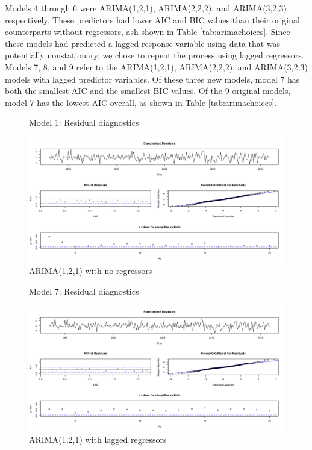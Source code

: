 \documentclass[twoside,twocolumn]{article}
\begin{document}
Models 4 through 6 were ARIMA(1,2,1), ARIMA(2,2,2), and ARIMA(3,2,3) respectively.  These predictors had lower AIC and BIC values than their original counterparts without regressors, ash shown in Table \ref{tab:arimachoices}. Since these models had predicted a lagged response variable using data that was potentially nonstationary, we chose to repeat the process using lagged regressors.  Models 7, 8, and 9 refer to the ARIMA(1,2,1), ARIMA(2,2,2), and ARIMA(3,2,3) models with lagged predictor variables.  Of these three new models, model 7 has both the smallest AIC and the smallest BIC values. Of the 9 original models, model 7 has the lowest AIC overall, as shown in Table \ref{tab:arimachoices}.


		    \begin{figure}[htb]
    	\centering
    	\caption{Model 1: Residual diagnostics}
     	\includegraphics[width=\linewidth]{images/sarima1}
     	\caption*{ARIMA(1,2,1) with no regressors}
     	\label{fig:sarimamod1}
     \end{figure}


    \begin{figure}[htb]
    	\centering
    	\caption{Model 7: Residual diagnostics}
     	\includegraphics[width=\linewidth]{images/sarima7}
     	\caption*{ARIMA(1,2,1) with lagged regressors}
     	\label{fig:sarimamod7}
     \end{figure}
\end{document}

